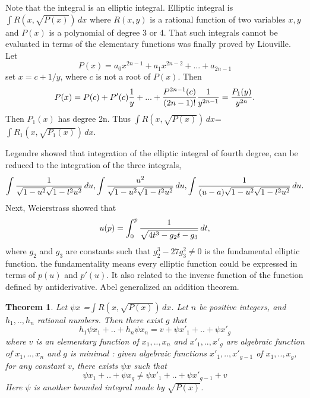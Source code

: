 \documentclass[11pt]{amsart}
\newtheorem{thm}{Theorem}[section]
\theoremstyle{definition}
\begin{document}
\vspace{2ex}
Note that the integral is an elliptic integral. Elliptic integral is $\int R(x,\sqrt{P(x)})\, dx$ where $R(x,y)$ is a rational function of two variables $x,y$ and $P(x)$ is a polynomial of degree 3 or 4. That such integrals cannot be evaluated in terms of the elementary functions was finally proved by Liouville.
\newline 
\indent Let 
\begin{equation*}P(x)=a_0x^{2n-1}+a_1x^{2n-2}+...+a_{2n-1}
\end{equation*}
set $x=c+1/y$, where $c$ is not a root of $P(x)$. Then
\begin{equation*} P(x)=P(c)+P'(c){1 \over y}+...+{P^{2n-1}(c) \over (2n-1)!}{1 \over y^{2n-1}}= {P_1(y) \over y^{2n}}.
\end{equation*} 
Then $P_1(x)$ has degree 2n. Thus $\int R(x,\sqrt{P(x)})\, dx$=$\int R_1(x,\sqrt{P_1(x)})\, dx$.
\newline

Legendre showed that integration of the elliptic integral of fourth degree, can be reduced to the integration of the three integrals,
\begin{equation*} \int {1 \over \sqrt{1-u^{2}}\sqrt{1-l^{2}u^{2}}}\, du, \int {u^{2} \over \sqrt{1-u^{2}}\sqrt{1-l^{2}u^{2}}}\, du, \int {1 \over (u-a)\sqrt{1-u^{2}}\sqrt{1-l^{2}u^{2}}}\, du.
\end{equation*}
\newline
Next, Weierstrass showed that 
\begin{equation*} u(p)= \int_{0}^{p} {1 \over \sqrt{4t^{3}-g_2t-g_3}}\, dt,
\end{equation*} where $g_2$ and $g_3$ are constants such that $g_2^{3}-27g_3^{2} \ne0$ is the fundamental elliptic function.
the fundamentality means every elliptic function could be expressed in terms of $p(u)$ and $p'(u)$. It also related to the inverse function of the function defined by antiderivative.
\newline
\indent Abel generalized an addition theorem.
\begin{thm} Let $\psi x$ =$\int {R(x,\sqrt{P(x)})}\, dx$. Let $n$ be positive integers, and $h_1,..,h_n$ rational numbers. Then there exist $g$ that
\begin{equation*}  h_1\psi x_1+..+h_n\psi x_n = v+\psi x'_1+..+\psi x'_g
\end{equation*} where $v$ is an elementary function of $x_1,..,x_n$ and $x'_1,..,x'_g$ are algebraic function of $x_1,..,x_n$ and $g$ is minimal : given algebraic functions $x'_1,..,x'_{g-1}$ of $x_1,..,x_g$, for any constant $v$, there exists $\psi x$ such that
\begin{equation*} \psi x_1+..+\psi x_g \ne \psi x'_1+..+\psi x'_{g-1}+v
\end{equation*}
Here $\psi$ is another bounded integral made by $\sqrt{P(x)}$.
\end{thm}
\end{document}
